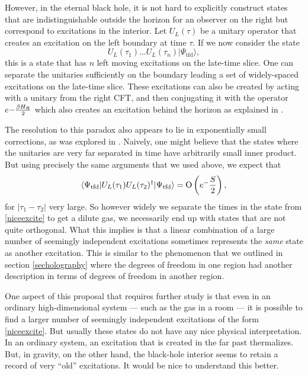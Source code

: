 \documentclass[12pt]{article}
\newcommand{\tfd}{\Psi_{\text{tfd}}} %
\def\Or[#1]{{\text{O}}\left({#1}\right)}
\newcommand{\be}{\begin{equation}}
\newcommand{\ee}{\end{equation}}
\begin{document}
However, in the eternal black hole,  it is not hard to explicitly construct states that are
indistinguishable outside the horizon for an observer on the right but correspond to excitations in the interior.  Let $U_L(\tau)$ be a unitary operator that creates an excitation on the left boundary at time $\tau$. If we now consider the state
\be
\label{niceexcite}
U_L(\tau_1) \ldots U_L(\tau_n) |\tfd \rangle,
\ee
this is a state that has $n$ left moving excitations on the late-time slice. One can separate the unitaries sufficiently on the boundary leading a set of widely-spaced excitations on the late-time slice.  These excitations can also be created by acting with a unitary from the right CFT, and then conjugating it with the operator $e{-{\beta H_R \over 2}}$ which also creates an excitation behind the horizon as explained in \cite{Papadodimas:2017qit,deBoer:2018ibj}.

The resolution to this paradox also appears to lie in exponentially small corrections, as was explored in \cite{Chakravarty:2020wdm, essay2020}. Naively, one might believe that the states where the unitaries are very far separated in time have arbitrarily small inner product. But using precisely the same arguments that we used above, we expect that
\be
\langle \tfd | U_L(\tau_1) U_L(\tau_2)^{\dagger} | \tfd \rangle = \Or[e^{-{S \over 2}}],
\ee
for $|\tau_1 - \tau_2|$ very large. So however widely we separate the times in the state from \eqref{niceexcite} to get a dilute gas, we necessarily end up with states that are not quite orthogonal.
What this implies is that a linear combination of a large number of seemingly independent excitations sometimes represents the {\em same} state as another excitation. This is similar to the phenomenon that we outlined in section \ref{secholography} where the degrees of freedom in one region had another description in terms of degrees of freedom in another region.









 One aspect of this proposal that requires further study is that even in an ordinary high-dimensional system --- such as the gas in a room --- it is possible to find a larger number of seemingly independent excitations of the form \eqref{niceexcite}.  But usually these states do not have any nice physical interpretation. In an ordinary system, an excitation that is created in the far past thermalizes. But, in gravity, on the other hand, the black-hole interior seems to  retain a record of very ``old'' excitations. It would be nice to understand this better.
\end{document}
